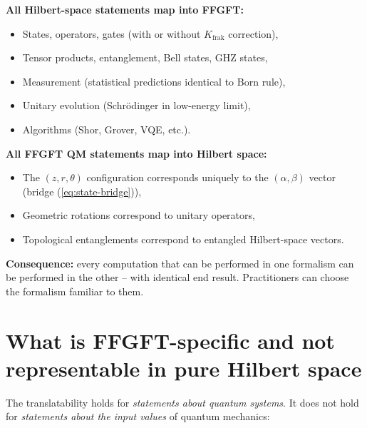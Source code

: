 \textbf{All Hilbert-space statements map into FFGFT:}
\begin{itemize}[leftmargin=2em,itemsep=2pt,topsep=2pt]
  \item States, operators, gates (with or without $K_{\text{frak}}$ correction),
  \item Tensor products, entanglement, Bell states, GHZ states,
  \item Measurement (statistical predictions identical to Born rule),
  \item Unitary evolution (Schrödinger in low-energy limit),
  \item Algorithms (Shor, Grover, VQE, etc.).
\end{itemize}

\textbf{All FFGFT QM statements map into Hilbert space:}
\begin{itemize}[leftmargin=2em,itemsep=2pt,topsep=2pt]
  \item The $(z, r, \theta)$ configuration corresponds uniquely to
        the $(\alpha, \beta)$ vector (bridge (\ref{eq:state-bridge})),
  \item Geometric rotations correspond to unitary operators,
  \item Topological entanglements correspond to entangled
        Hilbert-space vectors.
\end{itemize}

\textbf{Consequence:} every computation that can be performed in one
formalism can be performed in the other -- with identical end
result. Practitioners can choose the formalism familiar to them.

\section{What is FFGFT-specific and not representable in pure Hilbert space}

The translatability holds for \emph{statements about quantum systems}.
It does not hold for \emph{statements about the input values} of
quantum mechanics:

